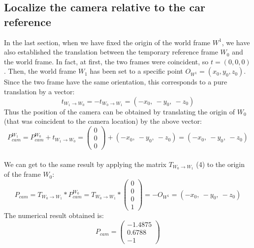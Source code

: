 \documentclass{article}
\begin{document}
\subsection{Localize the camera relative to the car reference}
In the last section, when we have fixed the origin of the world frame $W^1$, we have also established the translation between the temporary reference frame $W_0$ and the world frame. In fact, at first, the two frames were coincident, so $t=(0, 0, 0)$. Then, the world frame $W_1$ has been set to a specific point $O_{W^1}=(x_0, y_0, z_0)$. Since the two frame have the same orientation, this corresponds to a pure translation by a vector:
$$ t_{W_1 \rightarrow W_0} = -t_{W_0 \rightarrow W_1} = (-x_0, \: -y_0, \: -z_0) $$
Thus the position of the camera can be obtained by translating the origin of $W_0$ (that was coincident to the camera location) by the above vector:
$$ P_{cam}^{W_1} = P_{cam}^{W_0} + t_{W_1 \rightarrow W_0} = \begin{pmatrix}
0 \\ 0 \\ 0
\end{pmatrix} + (-x_0, \: -y_0, \: -z_0) = (-x_0, \: -y_0, \: -z_0) $$
\\
We can get to the same result by applying the matrix $T_{W_0 \rightarrow W_1}$ (4) to the origin of the frame $W_0$:
$$ P_{cam} = T_{W_0 \rightarrow W_1} * P_{cam}^{W_0} = T_{W_0 \rightarrow W_1} * \begin{pmatrix}
0 \\ 0 \\ 0 \\ 1
\end{pmatrix} = -O_{W^1} =  (-x_0, \: -y_0, \: -z_0) $$
The numerical result obtained is:
$$ P_{cam} = \begin{pmatrix}
-1.4875 \\ 0.6788 \\ -1
\end{pmatrix} $$
\end{document}
